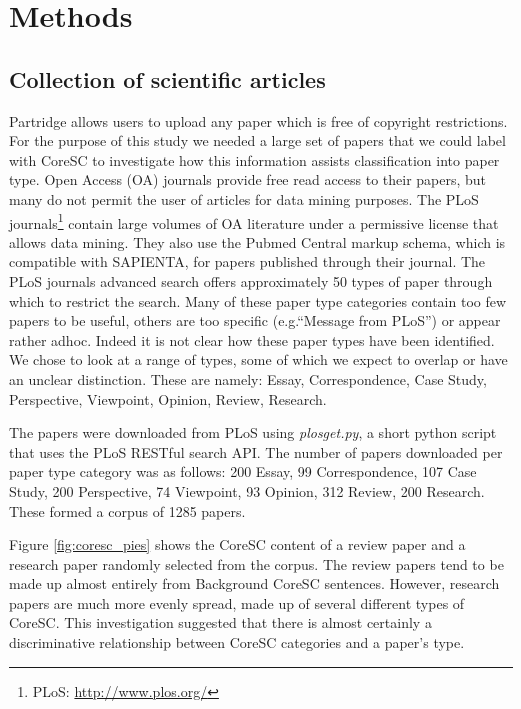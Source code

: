 \documentclass{svmult}
\begin{document}
\section{Methods}
\label{sec:2}

\subsection*{Collection of scientific articles} Partridge allows users to
upload any paper which is free of copyright restrictions.  For the purpose of
this study we needed a large set of papers that we could label with CoreSC to
investigate how this information assists classification into paper type.  Open
Access (OA) journals provide free read access to their papers, but many do not
permit the user of articles for data mining purposes. The PLoS
journals\footnote{PLoS: \url{http://www.plos.org/}} contain large volumes of OA
literature under a permissive license that allows data mining.  They also use
the Pubmed Central markup schema, which is compatible with SAPIENTA, for papers
published through their journal. The PLoS journals advanced search offers
approximately 50 types of paper through which to restrict the search.  Many of
these paper type categories contain too few papers to be useful, others are too
specific (e.g.``Message from PLoS'') or appear rather adhoc. Indeed it is not
clear how these paper types have been identified. We chose to look at a range
of types, some of which we expect to overlap or have an unclear distinction.
These are namely: Essay, Correspondence, Case Study, Perspective,
Viewpoint, Opinion, Review, Research. 

The papers were downloaded from PLoS using {\em plosget.py}, a short
python script that uses the PLoS RESTful search API. The number of
papers downloaded per paper type category was as follows: 200 Essay,
99 Correspondence, 107 Case Study, 200 Perspective, 74 Viewpoint, 93
Opinion, 312 Review, 200 Research.  These formed a corpus of 1285 %
papers.

Figure \ref{fig:coresc_pies} shows the CoreSC content of a review paper and a
research paper randomly selected from the corpus.  The review papers tend to be
made up almost entirely from Background CoreSC sentences.  However, research
papers are much more evenly spread, made up of several different types of
CoreSC.  This investigation suggested that there is almost certainly a
discriminative relationship between CoreSC categories and a paper's type. 
\end{document}
